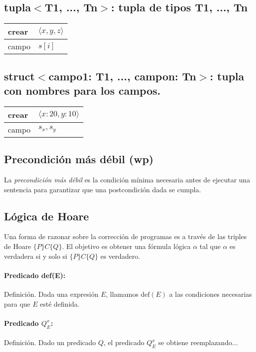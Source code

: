 \documentclass[9pt]{extarticle}  %
\newcommand{\smalltable}{\fontsize{8pt}{10pt}\selectfont}
\begin{document}
\subsection*{\tiny{tupla$<$T1, ..., Tn$>$: tupla de tipos T1, ..., Tn}}
\noindent\smalltable
\begin{tabularx}{\linewidth}{|X|X|}
\hline
crear & \( \langle x, y, z \rangle \) \\
\hline
campo & \( s[i] \) \\
\hline
\end{tabularx}

\subsection*{\tiny{struct$<$campo1: T1, ..., campon: Tn$>$: tupla con nombres para los campos.}}
\noindent\smalltable
\begin{tabularx}{\linewidth}{|X|X|}
\hline
crear & \( \langle x : 20, y : 10 \rangle \) \\
\hline
campo & \( s_x, s_y \) \\
\hline
\end{tabularx}
\subsection*{\tiny{Precondición más débil (wp)}}
\noindent\smalltable
La \textit{precondición más débil} es la condición mínima necesaria antes de ejecutar una sentencia para garantizar que una postcondición dada se cumpla.
\subsection*{\tiny{Lógica de Hoare}}
\noindent\smalltable
Una forma de razonar sobre la corrección de programas es a través de las triples de Hoare \(\{P\} C \{Q\}\). El objetivo es obtener una fórmula lógica \( \alpha \) tal que \( \alpha \) es verdadera si y solo si \(\{P\} C \{Q\}\) es verdadero.

\paragraph*{Predicado def(E):}
Definición. Dada una expresión \( E \), llamamos \( \text{def}(E) \) a las condiciones necesarias para que \( E \) esté definida.

\paragraph*{Predicado \( Q_{E}^x \):}
Definición. Dado un predicado \( Q \), el predicado \( Q_{E}^x \) se obtiene reemplazando...
\end{document}
